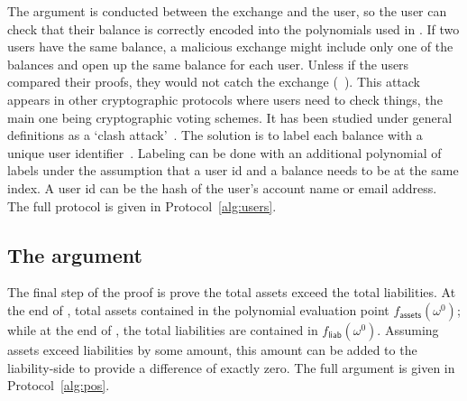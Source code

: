 The \userproof argument is conducted between the exchange and the user, so the user can check that their balance is correctly encoded into the polynomials used in \pol. If two users have the same balance, a malicious exchange might include only one of the balances and open up the same balance for each user. Unless if the users compared their proofs, they would not catch the exchange (\cf~\cite{broken}). This attack appears in other cryptographic protocols where users need to check things, the main one being cryptographic voting schemes. It has been studied under general definitions as a `clash attack'~\cite{clash}. The solution is to label each balance with a unique user identifier~\cite{provisions}. Labeling can be done with an additional polynomial of labels under the assumption that a user id and a balance needs to be at the same index. A user id can be the hash of the user's account name or email address.  The full protocol is given in Protocol~\ref{alg:users}.


\subsection{The \pos argument}


The final step of the proof is prove the total assets exceed the total liabilities. At the end of \poa, total assets contained in the polynomial evaluation point $f_\mathsf{assets}(\omega^0)$; while at the end of \pol, the total liabilities are contained in $f_\mathsf{liab}(\omega^0)$. Assuming assets exceed liabilities by some amount, this amount can be added to the liability-side to provide a difference of exactly zero. The full argument is given in Protocol~\ref{alg:pos}.


